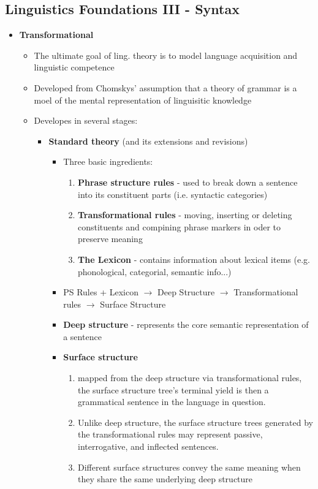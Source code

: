 \documentclass[11pt]{article}
\begin{document}
\subsection{Linguistics Foundations III - Syntax}
\begin{itemize}
 \item {\bf Transformational}
  \begin{itemize}
   \item The ultimate goal of ling. theory is to model language acquisition and linguistic competence
   \item Developed from Chomskys' assumption that a theory of grammar is a moel of the mental representation of linguisitic knowledge
   \item Developes in several stages:
    \begin{itemize}
     \item {\bf Standard theory} (and its extensions and revisions)
      \begin{itemize}
       \item Three basic ingredients:
	\begin{enumerate}
	 \item {\bf Phrase structure rules} - used to break down a sentence into its constituent parts (i.e. syntactic categories)
	 \item {\bf Transformational rules} - moving, inserting or deleting constituents and compining phrase markers in oder to preserve meaning
	 \item {\bf The Lexicon} - contains information about lexical items (e.g. phonological, categorial, semantic info...)
	\end{enumerate}
       \item PS Rules + Lexicon $\rightarrow$ Deep Structure $\rightarrow$ Transformational rules $\rightarrow$ Surface Structure
       \item {\bf Deep structure} - represents the core semantic representation of a sentence
       \item {\bf Surface structure}
	\begin{enumerate}
	 \item mapped from the deep structure via transformational rules, the surface structure tree's terminal yield is then a grammatical sentence in the language in question. 
	 \item Unlike deep structure, the surface structure trees generated by the transformational rules may represent passive, interrogative, and inflected sentences.
	 \item Different surface structures convey the same meaning when they share the same underlying deep structure

\end{enumerate}
\end{itemize}
\end{itemize}
\end{itemize}
\end{itemize}
\end{document}

